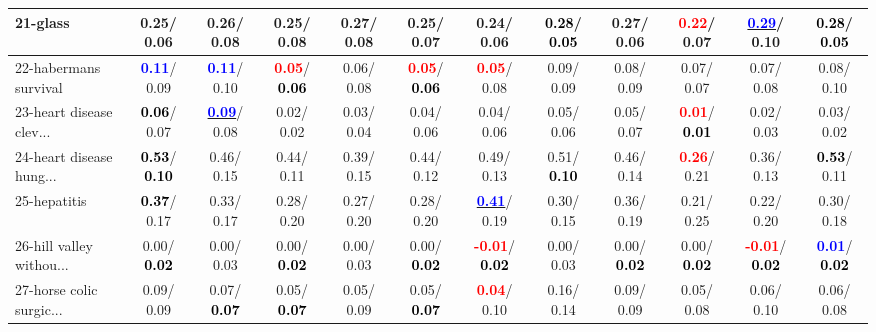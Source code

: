 \begin{table}[h]
\begin{center}
{\begin{tabular}{lc|c|c|c|c|c|c|c|c|c|c}
21-glass &   0.25/  0.06 &   0.26/  0.08 &   0.25/  0.08 &   0.27/  0.08 &   0.25/  0.07 &   0.24/  0.06 & \textcolor{black}{\textbf{  0.28}}/\textcolor{black}{\textbf{  0.05}} &   0.27/  0.06 & \textcolor{red}{\textbf{  0.22}}/  0.07 & \underline{\textcolor{blue}{\textbf{  0.29}}}/  0.10 & \textcolor{black}{\textbf{  0.28}}/\textcolor{black}{\textbf{  0.05}} \\ \hline
22-habermans survival & \textcolor{blue}{\textbf{  0.11}}/  0.09 & \textcolor{blue}{\textbf{  0.11}}/  0.10 & \textcolor{red}{\textbf{  0.05}}/\textcolor{black}{\textbf{  0.06}} &   0.06/  0.08 & \textcolor{red}{\textbf{  0.05}}/\textcolor{black}{\textbf{  0.06}} & \textcolor{red}{\textbf{  0.05}}/  0.08 &   0.09/  0.09 &   0.08/  0.09 &   0.07/  0.07 &   0.07/  0.08 &   0.08/  0.10 \\
23-heart disease clev... & \textcolor{black}{\textbf{  0.06}}/  0.07 & \underline{\textcolor{blue}{\textbf{  0.09}}}/  0.08 &   0.02/  0.02 &   0.03/  0.04 &   0.04/  0.06 &   0.04/  0.06 &   0.05/  0.06 &   0.05/  0.07 & \textcolor{red}{\textbf{  0.01}}/\textcolor{black}{\textbf{  0.01}} &   0.02/  0.03 &   0.03/  0.02 \\
24-heart disease hung... & \textcolor{black}{\textbf{  0.53}}/\textcolor{black}{\textbf{  0.10}} &   0.46/  0.15 &   0.44/  0.11 &   0.39/  0.15 &   0.44/  0.12 &   0.49/  0.13 &   0.51/\textcolor{black}{\textbf{  0.10}} &   0.46/  0.14 & \textcolor{red}{\textbf{  0.26}}/  0.21 &   0.36/  0.13 & \textcolor{black}{\textbf{  0.53}}/  0.11 \\
25-hepatitis & \textcolor{black}{\textbf{  0.37}}/  0.17 &   0.33/  0.17 &   0.28/  0.20 &   0.27/  0.20 &   0.28/  0.20 & \underline{\textcolor{blue}{\textbf{  0.41}}}/  0.19 &   0.30/  0.15 &   0.36/  0.19 &   0.21/  0.25 &   0.22/  0.20 &   0.30/  0.18 \\
26-hill valley withou... &   0.00/\textcolor{black}{\textbf{  0.02}} &   0.00/  0.03 &   0.00/\textcolor{black}{\textbf{  0.02}} &   0.00/  0.03 &   0.00/\textcolor{black}{\textbf{  0.02}} & \textcolor{red}{\textbf{ -0.01}}/\textcolor{black}{\textbf{  0.02}} &   0.00/  0.03 &   0.00/\textcolor{black}{\textbf{  0.02}} &   0.00/\textcolor{black}{\textbf{  0.02}} & \textcolor{red}{\textbf{ -0.01}}/\textcolor{black}{\textbf{  0.02}} & \textcolor{blue}{\textbf{  0.01}}/\textcolor{black}{\textbf{  0.02}} \\
27-horse colic surgic... &   0.09/  0.09 &   0.07/\textcolor{black}{\textbf{  0.07}} &   0.05/\textcolor{black}{\textbf{  0.07}} &   0.05/  0.09 &   0.05/\textcolor{black}{\textbf{  0.07}} & \textcolor{red}{\textbf{  0.04}}/  0.10 &   0.16/  0.14 &   0.09/  0.09 &   0.05/  0.08 &   0.06/  0.10 &   0.06/  0.08 \\

\end{tabular}}
\end{center}
\end{table}
